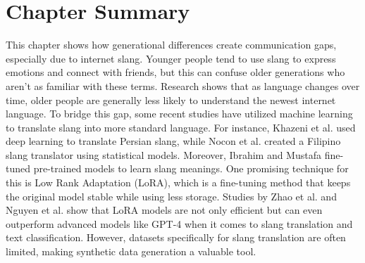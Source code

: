 \section{Chapter Summary}
This chapter shows how generational differences create communication gaps, especially due to internet slang.
Younger people tend to use slang to express emotions and connect with friends, but this can confuse older generations who aren't as familiar with these terms.
Research shows that as language changes over time, older people are generally less likely to understand the newest internet language.
To bridge this gap, some recent studies have utilized machine learning to translate slang into more standard language.
For instance, Khazeni et al. \cite{Khazeni} used deep learning to translate Persian slang, while Nocon et al. \cite{Nocon_Kho_Arroyo_2018} created a Filipino slang translator using statistical models.
Moreover, Ibrahim and Mustafa \cite{Ibrahim_Sharief} fine-tuned pre-trained models to learn slang meanings.
One promising technique for this is Low Rank Adaptation (LoRA), which is a fine-tuning method that keeps the original model stable while using less storage.
Studies by Zhao et al. \cite{zhao2024loraland310finetuned} and Nguyen et al. \cite{nguyen2023finetuningllama2large} show that LoRA models are not only efficient but can even outperform advanced models like GPT-4 when it comes to slang translation and text classification. 
However, datasets specifically for slang translation are often limited, making synthetic data generation a valuable tool. 